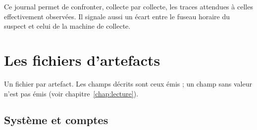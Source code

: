 \documentclass[11pt,a4paper,oneside]{report}
\begin{document}
Ce journal permet de confronter, collecte par collecte, les traces attendues à
celles effectivement observées. Il signale aussi un écart entre le fuseau horaire
du suspect et celui de la machine de collecte.

\section{Les fichiers d'artefacts}

Un fichier par artefact. Les champs décrits sont ceux émis ; un champ sans valeur
n'est pas émis (voir chapitre~\ref{chap:lecture}).

\subsection{Système et comptes}
\end{document}
